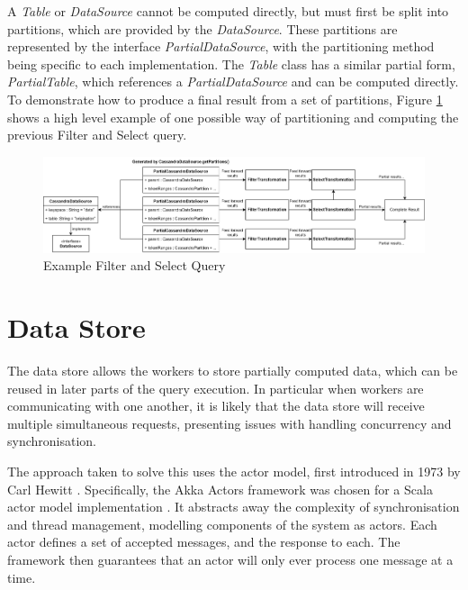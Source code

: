 A \textit{Table} or \textit{DataSource} cannot be computed directly, but must first be split into partitions, which are provided by the \textit{DataSource}. These partitions are represented by the interface \textit{PartialDataSource}, with the partitioning method being specific to each implementation. The \textit{Table} class has a similar partial form, \textit{PartialTable}, which references a \textit{PartialDataSource} and can be computed directly. To demonstrate how to produce a final result from a set of partitions, Figure \ref{fig:partial-filter-select-query} shows a high level example of one possible way of partitioning and computing the previous Filter and Select query.

\begin{figure}[htp]
	\centering
	\includegraphics[width=\textwidth]{chapters/diagrams/implementation/partial-filter-select-query}
	\caption{Example Filter and Select Query}
	\label{fig:partial-filter-select-query}
\end{figure}


\pagebreak
\section{Data Store}
The data store allows the workers to store partially computed data, which can be reused in later parts of the query execution. In particular when workers are communicating with one another, it is likely that the data store will receive multiple simultaneous requests, presenting issues with handling concurrency and synchronisation.

The approach taken to solve this uses the actor model, first introduced in 1973 by Carl Hewitt \cite{hewitt1973session}. Specifically, the Akka Actors framework was chosen for a Scala actor model implementation \cite{akkaactors}. It abstracts away the complexity of synchronisation and thread management, modelling components of the system as actors. Each actor defines a set of accepted messages, and the response to each. The framework then guarantees that an actor will only ever process one message at a time.

